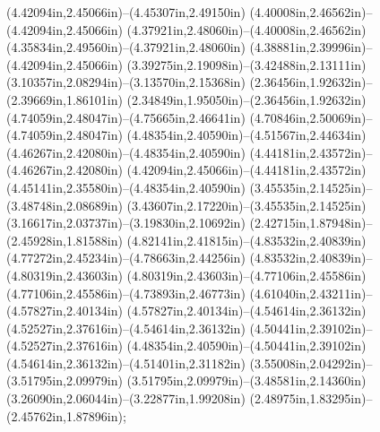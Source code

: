 (4.42094in,2.45066in)--(4.45307in,2.49150in) (4.40008in,2.46562in)--(4.42094in,2.45066in) (4.37921in,2.48060in)--(4.40008in,2.46562in) (4.35834in,2.49560in)--(4.37921in,2.48060in) (4.38881in,2.39996in)--(4.42094in,2.45066in) (3.39275in,2.19098in)--(3.42488in,2.13111in) (3.10357in,2.08294in)--(3.13570in,2.15368in) (2.36456in,1.92632in)--(2.39669in,1.86101in) (2.34849in,1.95050in)--(2.36456in,1.92632in) (4.74059in,2.48047in)--(4.75665in,2.46641in) (4.70846in,2.50069in)--(4.74059in,2.48047in) (4.48354in,2.40590in)--(4.51567in,2.44634in) (4.46267in,2.42080in)--(4.48354in,2.40590in) (4.44181in,2.43572in)--(4.46267in,2.42080in) (4.42094in,2.45066in)--(4.44181in,2.43572in) (4.45141in,2.35580in)--(4.48354in,2.40590in) (3.45535in,2.14525in)--(3.48748in,2.08689in) (3.43607in,2.17220in)--(3.45535in,2.14525in) (3.16617in,2.03737in)--(3.19830in,2.10692in) (2.42715in,1.87948in)--(2.45928in,1.81588in) (4.82141in,2.41815in)--(4.83532in,2.40839in) (4.77272in,2.45234in)--(4.78663in,2.44256in) (4.83532in,2.40839in)--(4.80319in,2.43603in) (4.80319in,2.43603in)--(4.77106in,2.45586in) (4.77106in,2.45586in)--(4.73893in,2.46773in) (4.61040in,2.43211in)--(4.57827in,2.40134in) (4.57827in,2.40134in)--(4.54614in,2.36132in) (4.52527in,2.37616in)--(4.54614in,2.36132in) (4.50441in,2.39102in)--(4.52527in,2.37616in) (4.48354in,2.40590in)--(4.50441in,2.39102in) (4.54614in,2.36132in)--(4.51401in,2.31182in) (3.55008in,2.04292in)--(3.51795in,2.09979in) (3.51795in,2.09979in)--(3.48581in,2.14360in) (3.26090in,2.06044in)--(3.22877in,1.99208in) (2.48975in,1.83295in)--(2.45762in,1.87896in);

